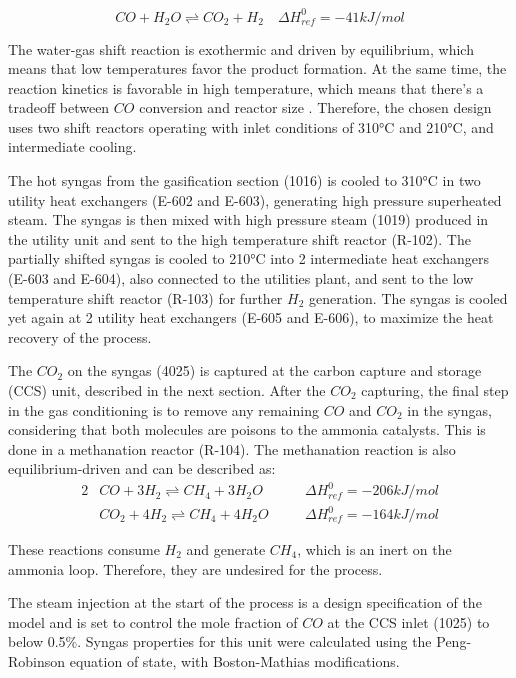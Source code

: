 \documentclass[a4paper, titlepage]{article}
\begin{document}
\begin{equation}
	CO + H_2O \rightleftharpoons CO_2 + H_2 \quad \Delta H_{ref}^0 = -41 kJ/mol
\end{equation}

The water-gas shift reaction is exothermic and driven by equilibrium, which means that low temperatures favor the
product formation. At the same time, the reaction kinetics is favorable in high temperature, which means that there's 
a tradeoff between $CO$ conversion and reactor size \cite{florez-orregoProcessSynthesisOptimization2018}. Therefore, 
the chosen design uses two shift reactors operating with inlet conditions of 310°C and 210°C, and intermediate cooling.

The hot syngas from the gasification section (1016) is cooled to 310°C in two utility heat exchangers
(E-602 and E-603), generating high pressure superheated steam. The syngas is then mixed with high pressure steam 
(1019) produced in the utility unit and sent to the high temperature shift reactor (R-102). The partially shifted 
syngas is cooled to 210°C into 2 intermediate heat exchangers (E-603 and E-604), also connected to the utilities 
plant, and sent to the low temperature shift reactor (R-103) for further $H_2$ generation. The syngas is cooled yet 
again at 2 utility heat exchangers (E-605 and E-606), to maximize the heat recovery of the process.

The $CO_2$ on the syngas (4025) is captured at the carbon capture and storage (CCS) unit, described in the next 
section. After the $CO_2$ capturing, the final step in the gas conditioning is to remove any remaining $CO$ and $CO_2$
in the syngas, considering that both molecules are poisons to the ammonia catalysts. This is done in a methanation 
reactor (R-104). The methanation reaction is also equilibrium-driven and can be described as:
\begin{alignat}{2}
	&CO + 3H_2 \rightleftharpoons CH_4 + 3H_2O \quad & &\Delta H_{ref}^0 = -206 kJ/mol \\
	&CO_2 + 4H_2 \rightleftharpoons CH_4 + 4H_2O \quad & &\Delta H_{ref}^0 = -164 kJ/mol
\end{alignat}


These reactions consume $H_2$ and generate $CH_4$, which is an inert on the ammonia loop. Therefore, they are undesired 
for the process.

The steam injection at the start of the process is a design specification of the model and is set to control the mole
fraction of $CO$ at the CCS inlet (1025) to below 0.5\%. Syngas properties for this unit were calculated using 
the Peng-Robinson equation of state, with Boston-Mathias modifications.
\end{document}
